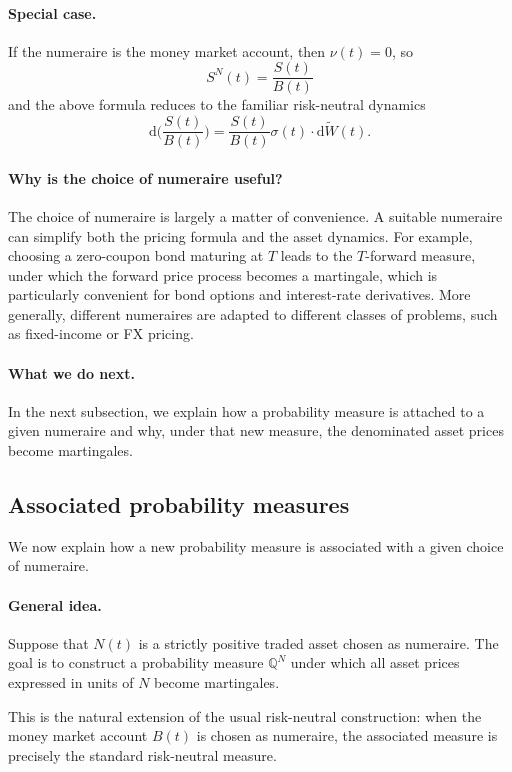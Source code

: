 \documentclass[11pt]{article}
\newcommand{\Qbb}{\mathbb{Q}}
\theoremstyle{definition}
\theoremstyle{plain}
\begin{document}
\paragraph{Special case.}

If the numeraire is the money market account, then \(\nu(t)=0\), so
\[
S^N(t)=\frac{S(t)}{B(t)}
\]
and the above formula reduces to the familiar risk-neutral dynamics
\[
\mathrm{d}\Big(\frac{S(t)}{B(t)}\Big)
=
\frac{S(t)}{B(t)}\sigma(t)\cdot \mathrm{d}\widetilde W(t).
\]


\paragraph{Why is the choice of numeraire useful?}
The choice of numeraire is largely a matter of convenience.
A suitable numeraire can simplify both the pricing formula and the asset
dynamics.
For example, choosing a zero-coupon bond maturing at \(T\) leads to the
\(T\)-forward measure, under which the forward price process becomes a
martingale, which is particularly convenient for bond options and
interest-rate derivatives. More generally, different numeraires are
adapted to different classes of problems, such as fixed-income or FX
pricing. 

\paragraph{What we do next.}
In the next subsection, we explain how a probability measure is attached
to a given numeraire and why, under that new measure, the denominated
asset prices become martingales.


\subsection{Associated probability measures}

We now explain how a new probability measure is associated with a given
choice of numeraire.

\paragraph{General idea.}
Suppose that \(N(t)\) is a strictly positive traded asset chosen as
numeraire.
The goal is to construct a probability measure \(\Qbb^N\) under which
all asset prices expressed in units of \(N\) become martingales.

This is the natural extension of the usual risk-neutral construction:
when the money market account \(B(t)\) is chosen as numeraire, the
associated measure is precisely the standard risk-neutral measure.
\end{document}
